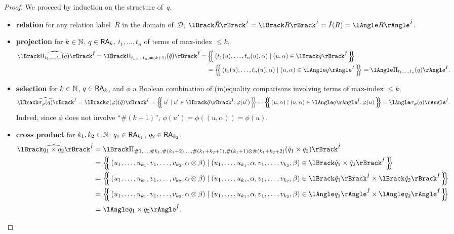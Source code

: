 \begin{proof}
	We proceed by induction on the structure of~$q$.

  \begin{itemize}
		\item \textbf{relation} for any relation label~$R$ in the domain
			of~$\mathcal{D}$,
			\(
			\sem{\hat I}{\hat R}=\sem{\hat I}{R}=\hat I(R)=\ansem{\hat I}{R}
			\).

		\item \textbf{projection} for $k\in\mathbb{N}$, $q\in\mathsf{RA}_{k}$,
			$t_1,\dots, t_n$ of terms of max-index $\leq k$,
      \begin{align*}
				\sem{\hat I}{\widehat{\Pi_{t_1,\dots,t_n}(q)}}
				=\sem{\hat I}{\Pi_{t_1,\dots,t_n,\#(k+1)}(\hat q)}
        =&\mset{(t_1(u),\dots,t_n(u),\alpha)\mid (u,\alpha)\in \sem{\hat
        I}{\hat q}}\\
        &=\mset{(t_1(u),\dots,t_n(u),\alpha)\mid (u,\alpha)\in \ansem{\hat I}{q}}
				=\ansem{\hat I}{\Pi_{t_1,\dots,t_n}(q)}.
      \end{align*}
		\item \textbf{selection} for $k\in\mathbb{N}$, $q\in\mathsf{RA}_k$, and
			$\phi$ a Boolean combination of (in)equality comparisons involving terms
			of max-index $\leq k$,
			\[
				\sem{\hat I}{\widehat{\sigma_\phi(q)}}
				=\sem{\hat I}{\sigma(\phi)(\hat q)}
				=\mset{u'\mid u'\in \sem{\hat I}{\hat q}, \phi(u')}
				=\mset{(u,\alpha)\mid (u,\alpha)\in \ansem{\hat I}{q}, \phi(u)}
				=\ansem{\hat I}{\sigma_\phi(q)}.
			\]
			Indeed, since $\phi$ does not involve ``$\#(k+1)$'',
			$\phi(u')=\phi((u,\alpha))=\phi(u)$.

		\item \textbf{cross product} for $k_1,k_2\in\mathbb{N}$, $q_1\in\mathsf{RA}_{k_1}$,
			$q_2\in\mathsf{RA}_{k_2}$,
			\begin{align*}
				\sem{\hat I}{\widehat{q_1\times q_2}}
				 & =\sem{\hat I}{\Pi_{\#1,\dots,\#k_1,\#(k_1+2),\dots,\#(k_1+k_2+1),\#(k_1+1)\otimes\#(k_1+k_2+2)}(\hat
				q_1\times\hat q_2)}                                                                                     \\
				 & =\mset{(u_1,\dots,u_{k_1},v_1,\dots,v_{k_2},\alpha\otimes\beta)\mid
				(u_1,\dots,u_{k_1},\alpha,v_1,\dots,v_{k_2},\beta)\in \sem{\hat I}{\hat q_1\times\hat q_2}}             \\
				 & =\mset{(u_1,\dots,u_{k_1},v_1,\dots,v_{k_2},\alpha\otimes\beta)\mid
				(u_1,\dots,u_{k_1},\alpha,v_1,\dots,v_{k_2},\beta)\in \sem{\hat
				I}{\hat q_1}\times\sem{\hat I}{\hat q_2}}                                                               \\
				 & =\mset{(u_1,\dots,u_{k_1},v_1,\dots,v_{k_2},\alpha\otimes\beta)\mid
				(u_1,\dots,u_{k_1},\alpha,v_1,\dots,v_{k_2},\beta)\in \ansem{\hat
				I}{q_1}\times \ansem{\hat I}{q_2}}                                                                      \\
				 & =\ansem{\hat I}{q_1\times q_2}.
			\end{align*}


\end{itemize}
\end{proof}
